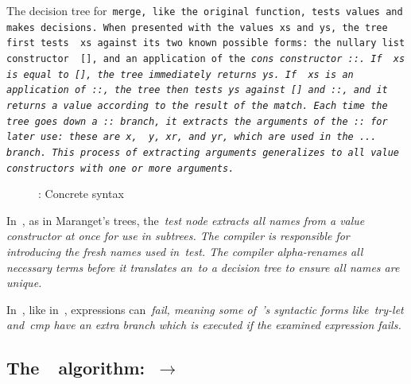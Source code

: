 \documentclass[manuscript,screen, 12pt, nonacm]{acmart}
\begin{document}
 The decision tree for~\tt{merge}, like the original function, tests values and
 makes decisions. When presented with the values~\tt{xs} and~\tt{ys}, the tree
 first tests ~\tt{xs} against its two known possible forms: the nullary list
 constructor ~\tt{[]}, and an application of the~\it{cons} constructor~\tt{::}.
 If ~\tt{xs} is equal to~\tt{[]}, the tree immediately returns~\tt{ys}. If
 ~\tt{xs} is an application of~\tt{::}, the tree then tests~\tt{ys}
 against~\tt{[]} and~\tt{::}, and it returns a value according to the result of
 the match. Each time the tree goes down a~\tt{::} branch, it extracts the
 arguments of the~\tt{::} for later use: these are~\tt{x}, ~\tt{y},~\tt{xr},
 and~\tt{yr}, which are used in the~\tt{...} branch. This process of extracting
 arguments generalizes to all value constructors with one or more arguments. 

  \begin{figure}
    \begin{center}
    \dcsyntax
    \end{center}
    \caption{\D: Concrete syntax}
    \label{fig:dsyntax}
    \end{figure}



  In~\D, as in Maranget's trees, the~\it{test} node extracts all names from a
  value constructor at once for use in subtrees. The compiler is responsible for
  introducing the fresh names used in~\it{test}. The compiler alpha-renames all
  necessary terms before it translates an~\iffibf to a decision tree to ensure
  all names are unique. 

  In~\D, like in~\VMinus, expressions can~\it{fail}, meaning some of~\D's
  syntactic forms like~\it{try-let} and~\it{cmp} have an extra branch which is
  executed if the examined expression fails. 

    \label{dsemantics}
    \dsemantics


    \subsection{The~\DTran\ algorithm:~\VMinus $\rightarrow$~\D}
\end{document}
